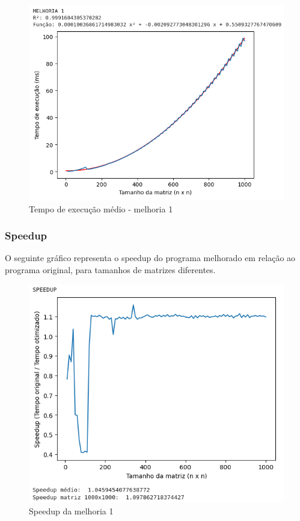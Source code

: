 \begin{figure}[!ht]
	\centering	
	\caption[\hspace{0.1cm}Tempo de execução médio - melhoria 1]{Tempo de execução médio - melhoria 1}
	  \vspace{-0.4cm}
	\includegraphics[width=.8\textwidth]{figuras/melhoria1.png}
\end{figure}

\subsubsection{\esp Speedup}

O seguinte gráfico representa o speedup do programa melhorado em relação ao programa original, para tamanhos de matrizes diferentes.

\begin{figure}[!ht]
	\centering	
	\caption[\hspace{0.1cm}Speedup da melhoria 1]{Speedup da melhoria 1}
	  \vspace{-0.4cm}
	\includegraphics[width=.8\textwidth]{figuras/speedup_melhoria1.png}
\end{figure}

